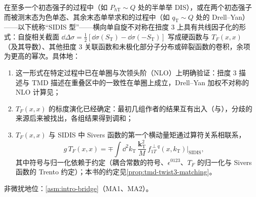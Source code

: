 \begin{proposition}\label{prop:power-twist3-sidis}
在至多一个初态强子的过程中（如 $P_{h\mathrm T}\sim Q$ 处的半单举 DIS），或在两个初态强子而被测末态为色单态、其余末态单举求和的过程中（如 $q_{\mathrm T}\sim Q$ 处的 Drell--Yan）——以下统称“SIDIS 型”——横向单自旋不对称在扭度 3 上具有共线因子化的形式：自旋相关截面 $\dd\Delta\sigma=\frac12[\dd\sigma(S_{\mathrm T})-\dd\sigma(-S_{\mathrm T})]$ 写成硬函数与 $T_F(x,x)$（及其导数）、其他扭度 3 关联函数和未极化部分子分布或碎裂函数的卷积，余项为更高的幂次。具体地：
\begin{enumerate}[label=(\alph*),leftmargin=2em,itemsep=0pt,topsep=2pt]
\item 这一形式在特定过程中已在单圈与次领头阶（NLO）上明确验证：扭度 3 描述与 TMD 描述在重叠区中的一致性在单圈上成立\cite{Ji:2006ub}，Drell--Yan 加权不对称的 NLO 计算见\cite{Vogelsang:2009pj}；
\item $T_F(x,x)$ 的标度演化已经确定：最初几组作者的结果互有出入（\cite{Braun:2009mi}与\cite{Kang:2008ey}），分歧的来源后来被找出，各组结果得到调和\cite{Kang:2012em,Schafer:2012ra}；
\item $T_F(x,x)$ 与 SIDIS 中 Sivers 函数的第一个横动量矩通过算符关系相联系，
\begin{equation}\label{eq:power-TF-sivers}
g\,T_F(x,x)=\mp\int\!\dd^2k_{\mathrm T}\,\frac{\mathbf k_{\mathrm T}^2}{M}\,f^{\perp q}_{1T}(x,k_{\mathrm T})\Big|_{\mathrm{SIDIS}},
\end{equation}
其中符号与归一化依赖于约定（耦合常数的符号、$\epsilon^{0123}$、$T_F$ 的归一化与 Sivers 函数的 Trento 约定）\cite{Boer:2003cm}；本书的约定见\cref{prop:tmd-twist3-matching}。
\end{enumerate}
非微扰地位：\cref{asm:intro-bridge}（MA1、MA2）。
\end{proposition}

